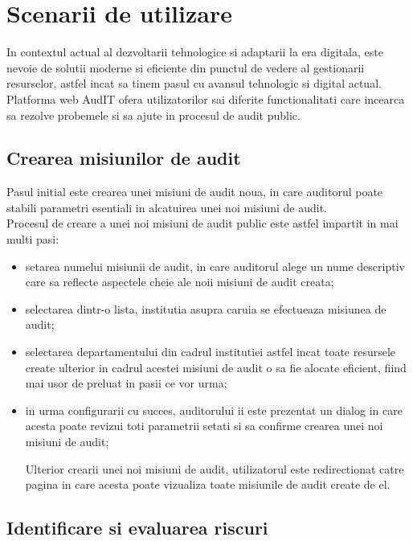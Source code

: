 \chapter{Scenarii de utilizare }

In contextul actual al dezvoltarii tehnologice si adaptarii la era digitala, este nevoie de solutii moderne si eficiente din punctul de vedere al gestionarii resurselor, astfel incat sa tinem pasul cu avansul tehnologic si digital actual.\\
Platforma web AudIT ofera utilizatorilor sai diferite functionalitati care incearca sa rezolve probemele si sa ajute in procesul de audit public.

\section{Crearea misiunilor de audit}
Pasul initial este crearea unei misiuni de audit noua, in care auditorul poate stabili parametri esentiali in alcatuirea unei noi misiuni de audit.\\
Procesul de creare a unei noi misiuni de audit public este astfel impartit in mai multi pasi:

\begin{itemize}
	\item   setarea numelui misiunii de audit, in care auditorul alege un nume descriptiv care sa reflecte aspectele cheie ale noii misiuni de audit creata;
	
	\item  selectarea dintr-o lista, institutia asupra caruia se efectueaza misiunea de audit;
	
	\item selectarea departamentului din cadrul institutiei astfel incat toate resursele create ulterior in cadrul acestei misiuni de audit o sa fie alocate eficient, fiind mai usor de preluat in pasii ce vor urma;
	
	\item in urma configurarii cu succes, auditorului ii este prezentat un dialog in care acesta poate revizui toti parametrii setati si sa confirme crearea unei noi misiuni de audit;
	
	Ulterior crearii unei noi misiuni de audit, utilizatorul este redirectionat catre pagina in care acesta poate vizualiza toate misiunile de audit create de el.
\end{itemize}



\section{Identificare si evaluarea riscuri}

